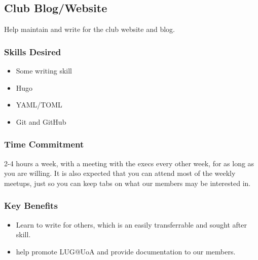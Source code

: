 \subsection{Club Blog/Website}

Help maintain and write for the club website and blog.

\subsubsection*{Skills Desired}

\begin{multicols}{2}
	\begin{itemize}
		\item Some writing skill
		\item Hugo
		\item YAML/TOML
		\item Git and GitHub
	\end{itemize}
\end{multicols}


\subsubsection*{Time Commitment}

2-4 hours a week, with a meeting with the execs every other week, for as long as you are willing. It is also expected that you can attend most of the weekly meetups, just so you can keep tabs on what our members may be interested in.

\subsubsection*{Key Benefits}

\begin{itemize}
	\item Learn to write for others, which is an easily transferrable and sought after skill.
	\item help promote LUG@UoA and provide documentation to our members.
\end{itemize}
